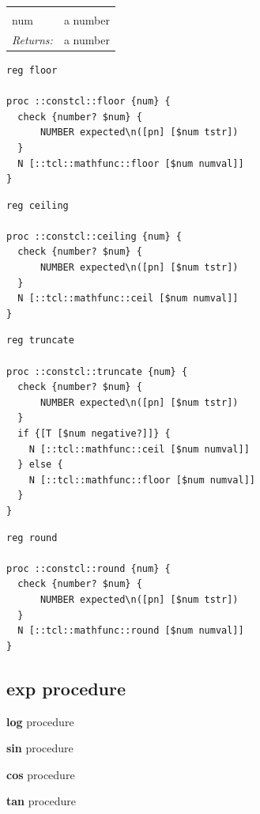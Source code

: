 \documentclass[a5paper,draft]{memoir}
\begin{document}
\noindent\begin{tabular}{ |p{1.9cm} p{6.5cm}| }
\hline
\rowcolor[HTML]{CCCCCC} \multicolumn{2}{|l|}{\textbf{floor, ceiling, truncate, round (public)}} \\
num & a number \\
\textit{Returns:} & a number \\
\hline
\end{tabular}

\begin{lstlisting}
reg floor

proc ::constcl::floor {num} {
  check {number? $num} {
      NUMBER expected\n([pn] [$num tstr])
  }
  N [::tcl::mathfunc::floor [$num numval]]
}
\end{lstlisting}

\begin{lstlisting}
reg ceiling

proc ::constcl::ceiling {num} {
  check {number? $num} {
      NUMBER expected\n([pn] [$num tstr])
  }
  N [::tcl::mathfunc::ceil [$num numval]]
}
\end{lstlisting}

\begin{lstlisting}
reg truncate

proc ::constcl::truncate {num} {
  check {number? $num} {
      NUMBER expected\n([pn] [$num tstr])
  }
  if {[T [$num negative?]]} {
    N [::tcl::mathfunc::ceil [$num numval]]
  } else {
    N [::tcl::mathfunc::floor [$num numval]]
  }
}
\end{lstlisting}

\begin{lstlisting}
reg round

proc ::constcl::round {num} {
  check {number? $num} {
      NUMBER expected\n([pn] [$num tstr])
  }
  N [::tcl::mathfunc::round [$num numval]]
}
\end{lstlisting}

\subsection{exp procedure}
\label{exp-procedure}

\noindent \textbf{log} procedure

\noindent \textbf{sin} procedure

\noindent \textbf{cos} procedure

\noindent \textbf{tan} procedure
\end{document}
